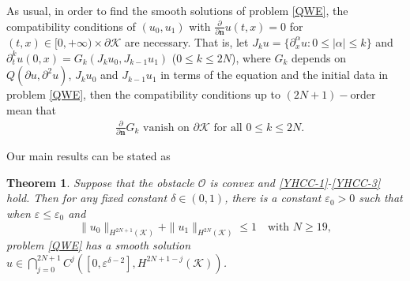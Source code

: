 \documentclass[11pt,twoside]{article}
\def\cK{\mathcal K}
\def\cO{\mathcal O}
\def\p{\partial}
\def\ve{\varepsilon}
\def\bn{\mathbf{n}}
\theoremstyle{plain}
\newtheorem{theorem}{Theorem}[section]
\theoremstyle{definition}
\numberwithin{equation}{section}
\begin{document}
As usual, in order to find the smooth solutions of problem \eqref{QWE}, the compatibility conditions of $(u_0,u_1)$
with $\frac{\p}{\p\bn}u(t,x)=0$ for $(t,x)\in[0,+\infty)\times\p\cK$ are necessary. That is,
let $J_ku=\{\p_x^{\alpha}u:0\le|\alpha|\le k\}$
and $\p_t^ku(0,x)=G_k(J_ku_0,J_{k-1}u_1)$ ($0\le k\le 2N$), where $G_k$ depends on $Q(\p u, \p^2u)$, $J_ku_0$ and $J_{k-1}u_1$
in terms of the equation and the initial data in problem \eqref{QWE},
then the compatibility conditions up to $(2N+1)-$order mean that
\begin{equation}\label{YHCC-3}
\begin{split}
&\text{$\frac{\p}{\p\bn}G_k$ vanish on $\p\cK$ for all $0\le k\le 2N$.}
\end{split}
\end{equation}



Our main results can be stated as
\begin{theorem}\label{thm1}
Suppose that the obstacle $\cO$ is convex and \eqref{YHCC-1}-\eqref{YHCC-3} hold.
Then for any fixed constant $\delta\in(0,1)$, there is a constant $\ve_0>0$ such that when $\ve\le\ve_0$ and
\begin{equation}\label{initial:data-thm1}
\|u_0\|_{H^{2N+1}(\cK)}+\|u_1\|_{H^{2N}(\cK)}\le1 \quad\text{with $N\ge19$},
\end{equation}
problem \eqref{QWE} has a smooth solution $u\in\bigcap\limits_{j=0}^{2N+1}C^{j}([0,\ve^{\delta-2}], H^{2N+1-j}(\cK))$.
\end{theorem}
\end{document}
